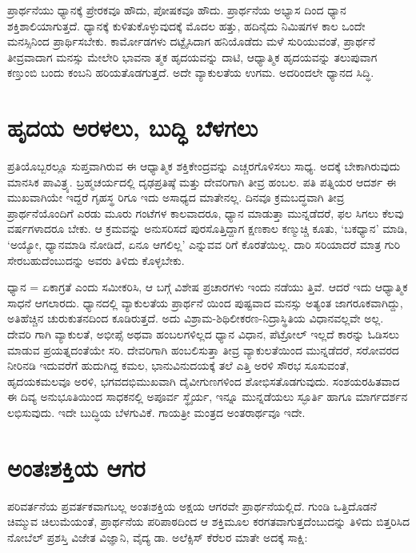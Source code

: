 ಪ್ರಾರ್ಥನೆಯು ಧ್ಯಾನಕ್ಕೆ ಪ್ರೇರಕವೂ ಹೌದು, ಪೋಷಕವೂ ಹೌದು. ಪ್ರಾರ್ಥನೆಯ ಅಭ್ಯಾಸ ದಿಂದ ಧ್ಯಾನ ಶಕ್ತಿಶಾಲಿಯಾಗುತ್ತದೆ. ಧ್ಯಾನಕ್ಕೆ ಕುಳಿತುಕೊಳ್ಳುವುದಕ್ಕೆ ಮೊದಲ ಹತ್ತು, ಹದಿನೈದು ನಿಮಿಷಗಳ ಕಾಲ ಒಂದೇ ಮನಸ್ಸಿನಿಂದ ಪ್ರಾರ್ಥಿಸಬೇಕು. ಕಾರ್ಮೋಡಗಳು ದಟ್ಟೈಸಿದಾಗ ಹನಿಯೊಡೆದು ಮಳೆ ಸುರಿಯುವಂತೆ, ಪ್ರಾರ್ಥನೆ ತೀವ್ರವಾದಾಗ ಮನಸ್ಸು ಮೇಲೇರಿ ಭಾವನಾ ತ್ಮಕ ಹೃದಯವನ್ನು ದಾಟಿ, ಆಧ್ಯಾತ್ಮಿಕ ಹೃದಯವನ್ನು ತಲುಪುವಾಗ ಕಣ್ತುಂಬಿ ಬಂದು ಕಂಬನಿ ಹರಿಯತೊಡಗುತ್ತದೆ. ಅದೇ ವ್ಯಾಕುಲತೆಯ ಉಗಮ. ಅದರಿಂದಲೇ ಧ್ಯಾನದ ಸಿದ್ಧಿ.


\section{ಹೃದಯ ಅರಳಲು, ಬುದ್ಧಿ ಬೆಳಗಲು}

ಪ್ರತಿಯೊಬ್ಬರಲ್ಲೂ ಸುಪ್ತವಾಗಿರುವ ಈ ಆಧ್ಯಾತ್ಮಿಕ ಶಕ್ತಿಕೇಂದ್ರವನ್ನು ಎಚ್ಚರಗೊಳಿಸಲು ಸಾಧ್ಯ. ಅದಕ್ಕೆ ಬೇಕಾಗಿರುವುದು ಮಾನಸಿಕ ಪಾವಿತ್ರ್ಯ. ಬ್ರಹ್ಮಚರ್ಯದಲ್ಲಿ ದೃಢಪ್ರತಿಷ್ಠೆ ಮತ್ತು ದೇವರಿಗಾಗಿ ತೀವ್ರ ಹಂಬಲ. ಪತಿ ಪತ್ನಿಯರ ಆದರ್ಶ ಈ ಮುಖವಾಗಿಯೇ ಇದ್ದರೆ ಗೃಹಸ್ಥ ರಿಗೂ ಇದು ಅಸಾಧ್ಯದ ಮಾತೇನಲ್ಲ. ದಿನವೂ ಕ್ರಮಬದ್ಧವಾಗಿ ತೀವ್ರ ಪ್ರಾರ್ಥನೆಯೊಂದಿಗೆ ಎರಡು ಮೂರು ಗಂಟೆಗಳ ಕಾಲವಾದರೂ, ಧ್ಯಾನ ಮಾಡುತ್ತಾ ಮುನ್ನಡೆದರೆ, ಫಲ ಸಿಗಲು ಕೆಲವು ವರ್ಷಗಳಾದರೂ ಬೇಕು. ಆ ಕ್ರಮವನ್ನು ಅನುಸರಿಸದೆ ಪುರಸೊತ್ತಿದ್ದಾಗ ಕ್ಷಣಕಾಲ ಕಣ್ಮುಚ್ಚಿ ಕೂತು, ‘ಬಕಧ್ಯಾನ’ ಮಾಡಿ, ‘ಅಯ್ಯೋ, ಧ್ಯಾನಮಾಡಿ ನೋಡಿದೆ, ಏನೂ ಆಗಲಿಲ್ಲ’ ಎನ್ನುವವ ರಿಗೆ ಕೊರತೆಯಿಲ್ಲ. ದಾರಿ ಸರಿಯಾದರೆ ಮಾತ್ರ ಗುರಿ ಸೇರಬಹುದೆಂಬುದನ್ನು ಅವರು ತಿಳಿದು ಕೊಳ್ಳಬೇಕು.

ಧ್ಯಾನ = ಏಕಾಗ್ರತೆ ಎಂದು ಸಮೀಕರಿಸಿ, ಆ ಬಗ್ಗೆ ವಿಶೇಷ ಪ್ರಚಾರಗಳು ಇಂದು ನಡೆಯು ತ್ತಿವೆ. ಆದರೆ ಇದು ಆಧ್ಯಾತ್ಮಿಕ ಸಾಧನೆ ಆಗಲಾರದು. ಧ್ಯಾನದಲ್ಲಿ ವ್ಯಾಕುಲತೆಯ ಪ್ರಾರ್ಥನೆ ಯಿಂದ ಪುಷ್ಟವಾದ ಮನಸ್ಸು ಅತ್ಯಂತ ಜಾಗರೂಕವಾಗಿದ್ದು, ಅತಿಹೆಚ್ಚಿನ ಚುರುಕುತನದಿಂದ ಕೂಡಿರುತ್ತದೆ. ಅದು ವಿಶ್ರಾಮ-ಶಿಥಿಲೀಕರಣ-ನಿದ್ರಾಸ್ಥಿತಿಯ ವಿಧಾನವಲ್ಲವೇ ಅಲ್ಲ. ದೇವರಿ ಗಾಗಿ ವ್ಯಾಕುಲತೆ, ಅಭೀಪ್ಸೆ ಅಥವಾ ಹಂಬಲಗಳಿಲ್ಲದ ಧ್ಯಾನ ವಿಧಾನ, ಪೆಟ್ರೋಲ್ ಇಲ್ಲದೆ ಕಾರನ್ನು ಓಡಿಸಲು ಮಾಡುವ ಪ್ರಯತ್ನದಂತೆಯೇ ಸರಿ. ದೇವರಿಗಾಗಿ ಹಂಬಲಿಸುತ್ತಾ ತೀವ್ರ ವ್ಯಾಕುಲತೆಯಿಂದ ಮುನ್ನಡೆದರೆ, ಸರೋವರದ ನೀರಿನಡಿ ಇದುವರೆಗೆ ಹುದುಗಿದ್ದ ಕಮಲ, ಭಾನುವಿನುದಯಕ್ಕೆ ತಲೆ ಎತ್ತಿ ಅರಳಿ ಸೌರಭ ಸೂಸುವಂತೆ, ಹೃದಯಕಮಲವೂ ಅರಳಿ, ಭಗವದಭಿಮುಖವಾಗಿ ದೈವೀಗುಣಗಳಿಂದ ಶೋಭಿಸತೊಡಗುವುದು. ಸಂಶಯರಹಿತವಾದ ಈ ದಿವ್ಯ ಅನುಭೂತಿಯಿಂದ ಸಾಧಕನಲ್ಲಿ ಅಪೂರ್ವ ಸ್ಥೈರ್ಯ, ಇನ್ನೂ ಮುನ್ನಡೆಯಲು ಸ್ಫೂರ್ತಿ ಹಾಗೂ ಮಾರ್ಗದರ್ಶನ ಲಭಿಸುವುದು. ಇದೇ ಬುದ್ಧಿಯ ಬೆಳಗುವಿಕೆ. ಗಾಯತ್ರೀ ಮಂತ್ರದ ಅಂತರಾರ್ಥವೂ ಇದೇ.


\section{ಅಂತಃಶಕ್ತಿಯ ಆಗರ}

ಪರಿವರ್ತನೆಯ ಪ್ರವರ್ತಕವಾಗಬಲ್ಲ ಅಂತಃಶಕ್ತಿಯ ಅಕ್ಷಯ ಆಗರವೇ ಪ್ರಾರ್ಥನೆಯಲ್ಲಿದೆ. ಗುಂಡಿ ಒತ್ತಿದೊಡನೆ ಚಿಮ್ಮುವ ಚಿಲುಮೆಯಂತೆ, ಪ್ರಾರ್ಥನೆಯ ಪರಿಪಾಠದಿಂದ ಆ ಶಕ್ತಿಮೂಲ ಕರಗತವಾಗುತ್ತದೆಂಬುದನ್ನು ತಿಳಿದು ಬಿತ್ತರಿಸಿದ ನೋಬೆಲ್ ಪ್ರಶಸ್ತಿ ವಿಜೇತ ವಿಜ್ಞಾನಿ, ವೈದ್ಯ ಡಾ. ಅಲೆಕ್ಸಿಸ್ ಕೆರೆಲರ ಮಾತೇ ಅದಕ್ಕೆ ಸಾಕ್ಷಿ:

